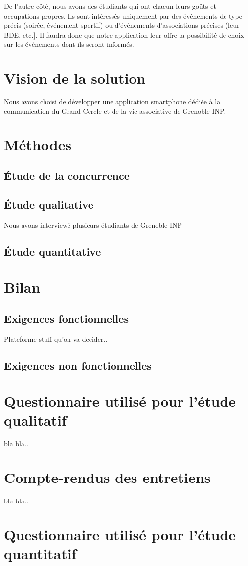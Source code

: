 \documentclass[a4paper, 11px]{article}
\begin{document}
De l'autre côté, nous avons des étudiants qui ont chacun leurs goûts et occupations propres. Ils sont intéressés uniquement par des événements de type précis (soirée, événement sportif)
ou d'événements d'associations précises (leur BDE, etc.]. Il faudra donc que notre application leur offre la possibilité de choix sur les événements dont ils seront informés.


\newpage


\section{Vision de la solution}
Nous avons choisi de développer une application smartphone dédiée à la communication du Grand Cercle et de la vie associative de Grenoble INP.

\newpage

\section{Méthodes}

\subsection{Étude de la concurrence}

\subsection{Étude qualitative}
Nous avons interviewé plusieurs étudiants de Grenoble INP

\subsection{Étude quantitative}

\newpage

\section{Bilan}

\subsection{Exigences fonctionnelles}

Plateforme
stuff qu'on va decider..

\subsection{Exigences non fonctionnelles}


\appendix
\addappheadtotoc

\newpage

\section{Questionnaire utilisé pour l'étude qualitatif}

bla bla..
\newpage

\section{Compte-rendus des entretiens}

bla bla..
\newpage

\section{Questionnaire utilisé pour l'étude quantitatif}
\end{document}
